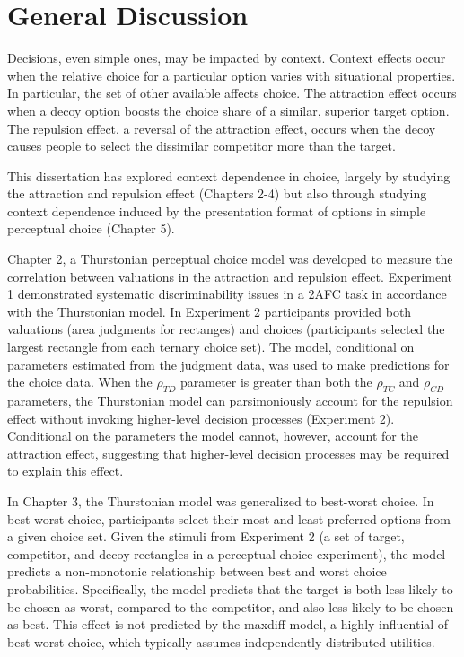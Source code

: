 \section{General Discussion}

Decisions, even simple ones, may be impacted by context. Context effects occur when the relative choice for a particular option varies with situational properties. In particular, the set of other available affects choice. The attraction effect occurs when a decoy option boosts the choice share of a similar, superior target option. The repulsion effect, a reversal of the attraction effect, occurs when the decoy causes people to select the dissimilar competitor more than the target. 

This dissertation has explored context dependence in choice, largely by studying the attraction and repulsion effect (Chapters 2-4) but also through studying context dependence induced by the presentation format of options in simple perceptual choice (Chapter 5).

Chapter 2, a Thurstonian perceptual choice model was developed to measure the correlation between valuations in the attraction and repulsion effect. Experiment 1 demonstrated systematic discriminability issues in a 2AFC task in accordance with the Thurstonian model. In Experiment 2 participants provided both valuations (area judgments for rectanges) and choices (participants selected the largest rectangle from each ternary choice set). The model, conditional on parameters estimated from the judgment data, was used to make predictions for the choice data. When the $\rho_{TD}$ parameter is greater than both the $\rho_{TC}$ and $\rho_{CD}$ parameters, the Thurstonian model can parsimoniously account for the repulsion effect without invoking higher-level decision processes (Experiment 2). Conditional on the parameters the model cannot, however, account for the attraction effect, suggesting that higher-level decision processes may be required to explain this effect. 

In Chapter 3, the Thurstonian model was generalized to best-worst choice. In best-worst choice, participants select their most and least preferred options from a given choice set. Given the stimuli from Experiment 2 (a set of target, competitor, and decoy rectangles in a perceptual choice experiment), the model predicts a non-monotonic relationship between best and worst choice probabilities. Specifically, the model predicts that the target is both less likely to be chosen as worst, compared to the competitor, and also less likely to be chosen as best. This effect is not predicted by the maxdiff model, a highly influential of best-worst choice, which typically assumes independently distributed utilities. 


